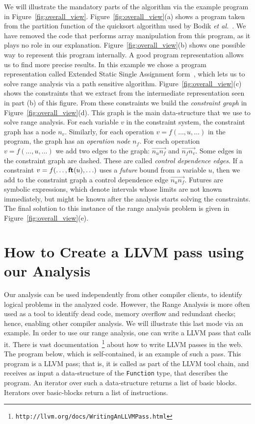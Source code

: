 \documentclass{paper}
\newcommand{\fun}[1]{\mbox{\textbf{#1}}}
\begin{document}
We will illustrate the mandatory parts of the
algorithm via the example program in Figure~\ref{fig:overall_view}.
Figure~\ref{fig:overall_view}(a) shows a program taken from the
partition function of the quicksort algorithm used by Bodik
{\em et al.}~\cite{Bodik00}.
We have removed the code that performs array manipulation from this program,
as it plays no role in our explanation.
Figure~\ref{fig:overall_view}(b) shows one possible way to represent this
program internally.
A good program representation allows us to find more precise results.
In this example we chose a program representation called
Extended Static Single Assignment form~\cite{Bodik00}, which lets us to solve
range analysis via a path sensitive algorithm.
Figure~\ref{fig:overall_view}(c) shows the constraints that we extract from
the intermediate representation seen in part (b) of this figure.
From these constraints we build the {\em constraint graph} in
Figure~\ref{fig:overall_view}(d).
This graph is the main data-structure that we use to solve range analysis.
For each variable $v$ in the constraint system, the constraint graph has a node
$n_v$.
Similarly, for each operation $v = f(\ldots, u, \ldots)$ in the program, the
graph has an {\em operation node} $n_f$.
For each operation $v = f(\ldots, u, \ldots)$ we add two edges to the
graph: $\overrightarrow{n_un_f}$ and $\overrightarrow{n_fn_v}$.
Some edges in the constraint graph are dashed.
These are called {\em control dependence edges}.
If a constraint $v = f(\ldots, \fun{ft}(u), \ldots)$ uses a {\em future}
bound from a variable $u$, then we add to the constraint graph a control
dependence edge $\overrightarrow{n_un_f}$.
Futures are symbolic expressions, which denote intervals whose limits are
not known immediately, but might be known after the analysis starts solving
the constraints.
The final solution to this instance of the range analysis problem is
given in Figure~\ref{fig:overall_view}(e).



\section{How to Create a LLVM pass using our Analysis}
\label{sec:howto}

Our analysis can be used independently from other compiler clients, to identify
logical problems in the analyzed code.
However, the Range Analysis is more often used as a tool to identify dead code,
memory overflow and redundant checks; hence, enabling other compiler analysis.
We will illustrate this last mode via an example.
In order to use our range analysis, one can write a LLVM pass that calls it.
There is vast documentation~\footnote{\texttt{http://llvm.org/docs/WritingAnLLVMPass.html}} about how to write LLVM passes in the web.
The program below, which is self-contained, is an example of such a pass.
This program is a LLVM pass; that is, it is called as part of the LLVM
tool chain, and receives as input a data-structure of the \texttt{Function}
type, that describes the program.
An iterator over such a data-structure returns a list of basic blocks.
Iterators over basic-blocks return a list of instructions.
\end{document}
